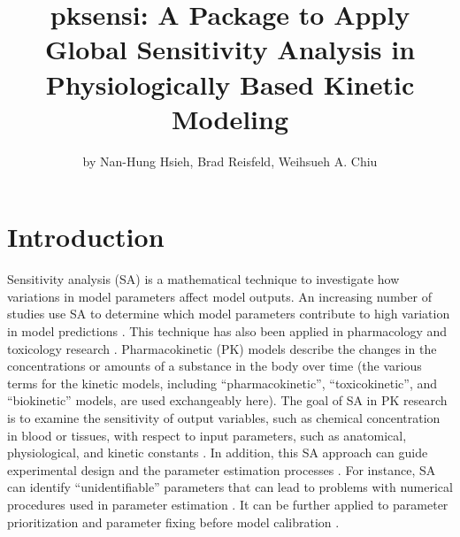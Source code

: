 \title{pksensi: A Package to Apply Global Sensitivity Analysis in
Physiologically Based Kinetic Modeling}
\author{by Nan-Hung Hsieh, Brad Reisfeld, Weihsueh A. Chiu}

\maketitle



\hypertarget{introduction}{%
\section{Introduction}\label{introduction}}

Sensitivity analysis (SA) is a mathematical technique to investigate how
variations in model parameters affect model outputs. An increasing
number of studies use SA to determine which model parameters contribute
to high variation in model predictions \citep{ferretti2016trends}. This
technique has also been applied in pharmacology and toxicology research
\citep{loizou2015application, mcnally2012reconstruction}.
Pharmacokinetic (PK) models describe the changes in the concentrations
or amounts of a substance in the body over time (the various terms for
the kinetic models, including ``pharmacokinetic'', ``toxicokinetic'',
and ``biokinetic'' models, are used exchangeably here). The goal of SA
in PK research is to examine the sensitivity of output variables, such
as chemical concentration in blood or tissues, with respect to input
parameters, such as anatomical, physiological, and kinetic constants
\citep{mcnally2011workflow}. In addition, this SA approach can guide
experimental design and the parameter estimation processes
\citep{zhang2015sobol}. For instance, SA can identify ``unidentifiable''
parameters that can lead to problems with numerical procedures used in
parameter estimation \citep{chu2010quantitative}. It can be further
applied to parameter prioritization and parameter fixing before model
calibration \citep{fphar201800588}.

